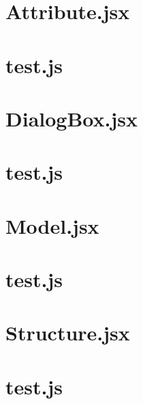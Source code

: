 \documentclass[a4paper,landscape]{report}
\begin{document}
\newpage
\section{Attribute.jsx}


\newpage
\section{test.js}


\newpage
\section{DialogBox.jsx}


\newpage
\section{test.js}


\newpage
\section{Model.jsx}


\newpage
\section{test.js}


\newpage
\section{Structure.jsx}


\newpage
\section{test.js}

\end{document}
